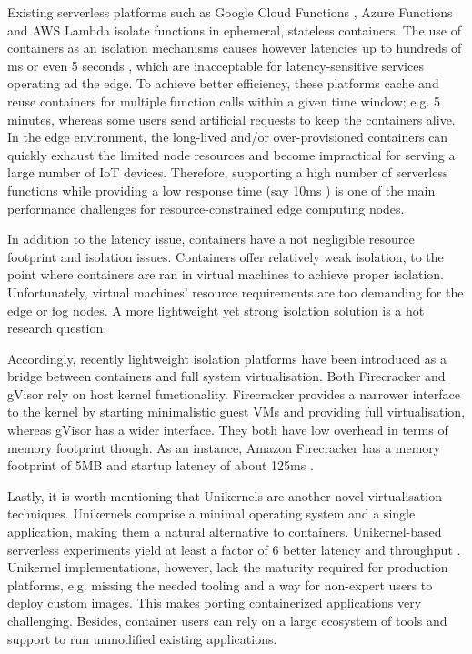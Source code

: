 \documentclass{ieeeaccess}
\begin{document}
Existing serverless platforms such as Google Cloud Functions \cite{gcloud-functions}, Azure Functions \cite{azure-functions} and AWS Lambda \cite{aws-lambda} isolate functions in ephemeral, stateless containers. The use of containers as an isolation mechanisms causes however latencies up to hundreds of ms or even 5 seconds \cite{serverless-evaluation}, which are inacceptable for latency-sensitive services operating ad the edge. To achieve better efficiency, these platforms cache and reuse containers for multiple function calls within a given time window; e.g. 5 minutes, whereas some users send artificial requests to keep the containers alive. In the edge environment, the long-lived and/or over-provisioned containers can quickly exhaust the limited node resources and become impractical for serving a large number of IoT devices. Therefore, supporting a high number of serverless functions while providing a low response time (say 10ms \cite{urllc}) is one of the main performance challenges for resource-constrained edge computing nodes.

In addition to the latency issue, containers have a not negligible resource footprint and isolation issues. Containers offer relatively weak isolation, to the point where containers are ran in virtual machines to achieve proper isolation. Unfortunately, virtual machines' resource requirements are too demanding for the edge or fog nodes. A more lightweight yet strong isolation solution is a hot research question.

Accordingly, recently lightweight isolation platforms have been introduced as a bridge between containers and full system virtualisation. Both Firecracker and gVisor \cite{gvisor-firecracker} rely on host kernel functionality. Firecracker provides a narrower interface to the kernel by starting minimalistic guest VMs and providing full virtualisation, whereas gVisor has a wider interface. They both have low overhead in terms of memory footprint though. As an instance, Amazon Firecracker has a memory footprint of 5MB and startup latency of about 125ms \cite{firecracker}.

Lastly, it is worth mentioning that Unikernels \cite{unikernels} are another novel virtualisation techniques. Unikernels comprise a minimal operating system and a single application, making them a natural alternative to containers. Unikernel-based serverless experiments yield at least a factor of 6 better latency and throughput \cite{unikernels-performance}. Unikernel implementations, however, lack the maturity required for production platforms, e.g. missing the needed tooling and a way for non-expert users to deploy custom images. This makes porting containerized applications very challenging. Besides, container users can rely on a large ecosystem of tools and support to run unmodified existing applications.
\end{document}
